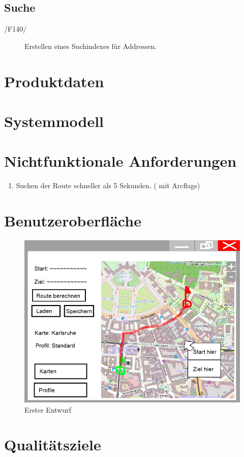 \documentclass[a4paper, 11pt]{article}
\begin{document}
\subsection{Suche}
\begin{description}
\item[/F140/]
Erstellen eines Suchindexes für Addressen.

\end{description}
\section{Produktdaten}
\section{Systemmodell}
\section{Nichtfunktionale Anforderungen}

\begin{enumerate}
\item Suchen der Route schneller als 5 Sekunden. (  mit Arcflags)

\end{enumerate}
\section{Benutzeroberfläche}
\begin{figure}
\centering
\includegraphics[width=0.7\linewidth]{mockup_screenshot}
\caption{Erster Entwurf}
\label{fig:mockupscreenshot}
\end{figure}
\section{Qualitätsziele}
\end{document}
